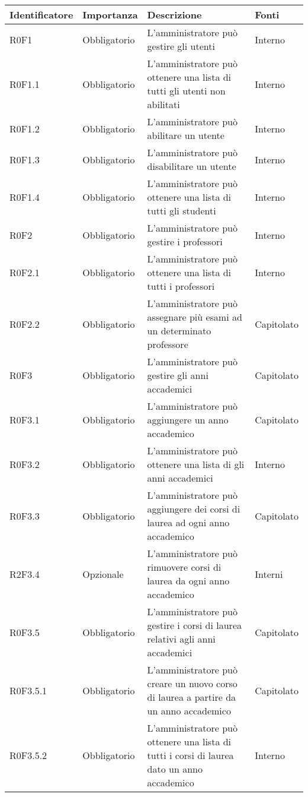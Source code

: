 \documentclass[AnalisiDeiRequisiti.tex]{subfiles}
\begin{document}
\label{table:Tabella requisiti funzionali}
\begin{longtable}[H]{|p{2.5cm}|p{2.5cm}|p{5cm}|p{2cm}|}
	\hline
	\rowcolor[HTML]{38FFF8} 
	\textbf{Identificatore} & \textbf{Importanza} & \textbf{Descrizione} & \textbf{Fonti} \\ \hline
	\endhead
	R0F1 & Obbligatorio & L'amministratore può gestire gli utenti & Interno \\ \hline
	R0F1.1 & Obbligatorio & L'amministratore può ottenere una lista di tutti gli utenti non abilitati & Interno \\ \hline
	R0F1.2 & Obbligatorio & L'amministratore può abilitare un utente & Interno \\ \hline
	R0F1.3 & Obbligatorio & L'amministratore può disabilitare un utente & Interno \\ \hline
	R0F1.4 & Obbligatorio & L'amministratore può ottenere una lista di tutti gli studenti & Interno \\ \hline
	R0F2 & Obbligatorio & L'amministratore può gestire i professori & Interno \\ \hline
	R0F2.1 & Obbligatorio & L'amministratore può ottenere una lista di tutti i professori & Interno \\ \hline
	R0F2.2 & Obbligatorio & L'amministratore può assegnare più esami ad un determinato professore & Capitolato \\ \hline
	R0F3 & Obbligatorio & L'amministratore può gestire gli anni accademici & Capitolato \\ \hline
	R0F3.1 & Obbligatorio & L'amministratore può aggiungere un anno accademico & Capitolato \\ \hline
	R0F3.2 & Obbligatorio & L'amministratore può ottenere una lista di gli anni accademici & Interno \\ \hline
	R0F3.3 & Obbligatorio & L'amministratore può aggiungere dei corsi di laurea ad ogni anno accademico & Capitolato \\ \hline
	R2F3.4 & Opzionale & L'amministratore può rimuovere corsi di laurea da ogni anno accademico & Interni \\ \hline
	R0F3.5 & Obbligatorio & L'amministratore può gestire i corsi di laurea relativi agli anni accademici & Capitolato \\ \hline
	R0F3.5.1 & Obbligatorio & L'amministratore può creare un nuovo corso di laurea a partire da un anno accademico & Capitolato \\ \hline
	R0F3.5.2 & Obbligatorio & L'amministratore può ottenere una lista di tutti i corsi di laurea dato un anno accademico & Interno \\ \hline

\end{longtable}
\end{document}
